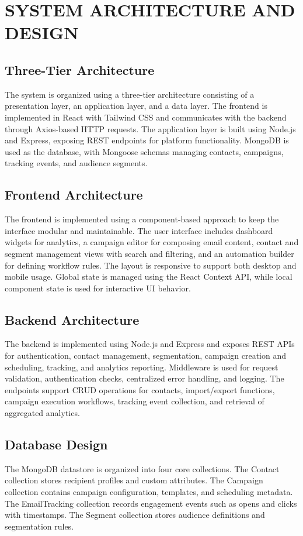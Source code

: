 \documentclass[12pt,journal,compsoc]{IEEEtran}
\begin{document}
\section{SYSTEM ARCHITECTURE AND DESIGN}

\subsection{Three-Tier Architecture}
The system is organized using a three-tier architecture consisting of a presentation layer, an application layer, and a data layer. The frontend is implemented in React with Tailwind CSS and communicates with the backend through Axios-based HTTP requests. The application layer is built using Node.js and Express, exposing REST endpoints for platform functionality. MongoDB is used as the database, with Mongoose schemas managing contacts, campaigns, tracking events, and audience segments.

\subsection{Frontend Architecture}
The frontend is implemented using a component-based approach to keep the interface modular and maintainable. The user interface includes dashboard widgets for analytics, a campaign editor for composing email content, contact and segment management views with search and filtering, and an automation builder for defining workflow rules. The layout is responsive to support both desktop and mobile usage. Global state is managed using the React Context API, while local component state is used for interactive UI behavior.

\subsection{Backend Architecture}
The backend is implemented using Node.js and Express and exposes REST APIs for authentication, contact management, segmentation, campaign creation and scheduling, tracking, and analytics reporting. Middleware is used for request validation, authentication checks, centralized error handling, and logging. The endpoints support CRUD operations for contacts, import/export functions, campaign execution workflows, tracking event collection, and retrieval of aggregated analytics.

\subsection{Database Design}
The MongoDB datastore is organized into four core collections. The Contact collection stores recipient profiles and custom attributes. The Campaign collection contains campaign configuration, templates, and scheduling metadata. The EmailTracking collection records engagement events such as opens and clicks with timestamps. The Segment collection stores audience definitions and segmentation rules.
\end{document}
